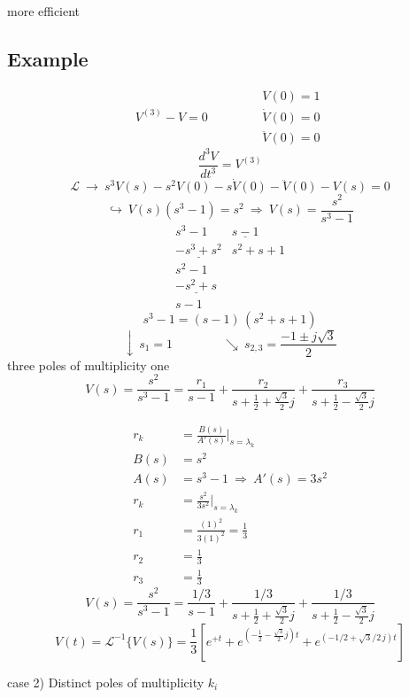 \documentclass[11pt,a4paper]{article}
\begin{document}
\noindent \textcolor{kirmizikalem}{more efficient}

\subsection{Example}
\[ V^{(3)}-V=0 \qquad\qquad \begin{array}{l} V(0)=1\\ \dot V(0)=0\\ \ddot V(0)=0 \end{array} \]
\[ \frac{d^3V}{dt^3} = V^{(3)} \]
\[ \mathcal{L}\ \rightarrow\ s^3V(s) - s^2V(0) - s\dot V(0) - \ddot V(0) - V(s) = 0 \]
\[ \hookrightarrow\ V(s)(s^3-1) = s^2 \ \Rightarrow\ V(s) = \frac{s^2}{s^3-1} \]
\[ \begin{array}{r|l}
s^3-1 & \underline{s-1} \\
\underline{-s^3+s^2} & s^2+s+1 \\
s^2-1 & \\
\underline{-s^2+s} & \\
s-1 &
\end{array} \]
\[ s^3-1 = (s-1)\,(s^2+s+1) \]
\[ \downarrow\ s_1=1 \qquad\qquad \searrow\ s_{2,3} = \frac{-1\pm j\sqrt{3}}{2} \]
\noindent three poles of multiplicity one
\[ V(s) = \frac{s^2}{s^3-1} = \frac{r_1}{s-1} + \frac{r_2}{s+\frac{1}{2}+\frac{\sqrt{3}}{2}j} + \frac{r_3}{s+\frac{1}{2}-\frac{\sqrt{3}}{2}j} \]

\[ \begin{aligned}
r_k &= \frac{B(s)}{A'(s)}\Big|_{s=\lambda_k} \\[4pt]
B(s) &= s^2 \\
A(s) &= s^3-1 \ \Rightarrow\ A'(s)=3s^2 \\[4pt]
r_k &= \frac{s^2}{3s^2}\Big|_{s=\lambda_k} \\[4pt]
r_1 &= \frac{(1)^2}{3(1)^2} = \frac{1}{3} \\[4pt]
r_2 &= \frac{1}{3} \\[4pt]
r_3 &= \frac{1}{3}
\end{aligned} \]
\[ V(s) = \frac{s^2}{s^3-1} = \frac{1/3}{s-1} + \frac{1/3}{s+\frac{1}{2}+\frac{\sqrt{3}}{2}j} + \frac{1/3}{s+\frac{1}{2}-\frac{\sqrt{3}}{2}j} \]
\[ V(t) = \mathcal{L}^{-1}\{V(s)\} = \frac{1}{3}\left[ e^{+t} + e^{\left(-\frac{1}{2}-\frac{\sqrt{3}}{2}j\right)t} + e^{(-1/2+\sqrt{3}/2\,j)t} \right] \]

\noindent \textcolor{kirmizikalem}{case 2)} Distinct poles of multiplicity $k_i$
\end{document}
